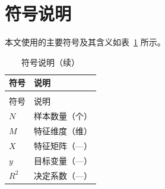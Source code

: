 \section{符号说明}

本文使用的主要符号及其含义如表~\ref{tab:symbols} 所示。

\begin{longtable}{@{}>{\centering\arraybackslash}p{}>{\raggedright\arraybackslash}p{}@{}}
  \caption{符号说明}
  \label{tab:symbols} \\
  \toprule
  符号 & 说明 \\
  \midrule
  \endfirsthead
  \caption{符号说明（续）} \\
  \toprule
  符号 & 说明 \\
  \midrule
  \endhead
  \bottomrule
  \endfoot
  $N$ & 样本数量（个）\\
  $M$ & 特征维度（维）\\
  $X$ & 特征矩阵（---）\\
  $y$ & 目标变量（---）\\
  $R^2$ & 决定系数（---）\\
\end{longtable}
